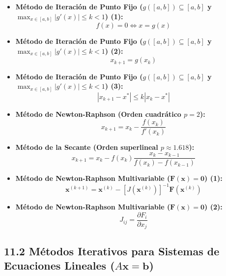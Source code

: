 \documentclass[11pt,a4paper]{article}
\begin{document}
\begin{itemize}
  \item \textbf{Método de Iteración de Punto Fijo ($g([a, b]) \subseteq [a, b]$ y $\max_{x \in [a, b]} |g'(x)| \le k < 1$) (1):}
  \[
    f(x) = 0 \iff x = g(x)
  \]
  \item \textbf{Método de Iteración de Punto Fijo ($g([a, b]) \subseteq [a, b]$ y $\max_{x \in [a, b]} |g'(x)| \le k < 1$) (2):}
  \[
    x_{k+1} = g(x_k)
  \]
  \item \textbf{Método de Iteración de Punto Fijo ($g([a, b]) \subseteq [a, b]$ y $\max_{x \in [a, b]} |g'(x)| \le k < 1$) (3):}
  \[
    |x_{k+1} - x^*| \le k |x_k - x^*|
  \]
  \item \textbf{Método de Newton-Raphson (Orden cuadrático $p = 2$):}
  \[
    x_{k+1} = x_k - \frac{f(x_k)}{f'(x_k)}
  \]
  \item \textbf{Método de la Secante (Orden superlineal $p \approx 1.618$):}
  \[
    x_{k+1} = x_k - f(x_k)\frac{x_k - x_{k-1}}{f(x_k) - f(x_{k-1})}
  \]
  \item \textbf{Método de Newton-Raphson Multivariable ($\mathbf{F}(\mathbf{x}) = \mathbf{0}$) (1):}
  \[
    \mathbf{x}^{(k+1)} = \mathbf{x}^{(k)} - [J(\mathbf{x}^{(k)})]^{-1}\mathbf{F}(\mathbf{x}^{(k)})
  \]
  \item \textbf{Método de Newton-Raphson Multivariable ($\mathbf{F}(\mathbf{x}) = \mathbf{0}$) (2):}
  \[
    J_{ij} = \frac{\partial F_i}{\partial x_j}
  \]
\end{itemize}

\subsection*{11.2 Métodos Iterativos para Sistemas de Ecuaciones Lineales ($A\mathbf{x} = \mathbf{b}$)}
\end{document}
